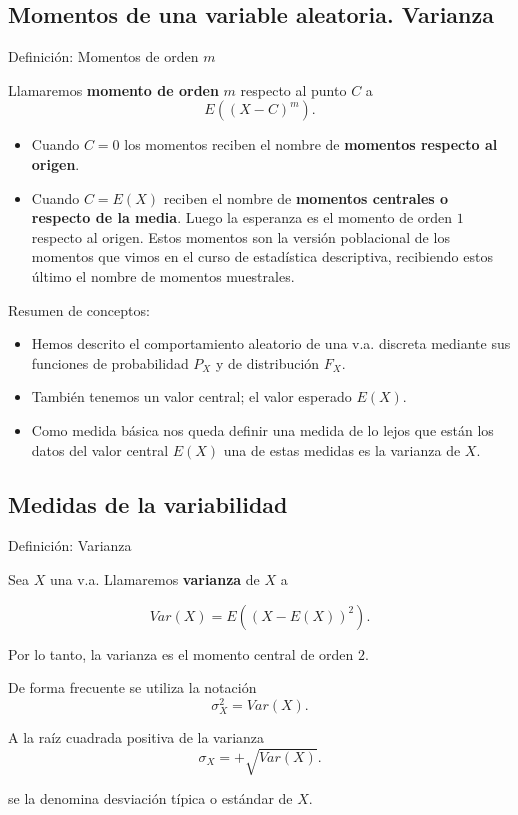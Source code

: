 \documentclass[
  letterpaper,
  DIV=11,
  numbers=noendperiod]{scrreprt}
\providecommand{\tightlist}{%
  \setlength{\itemsep}{0pt}\setlength{\parskip}{0pt}}\usepackage{longtable,booktabs,array}
\begin{document}
\subsection{Momentos de una variable aleatoria.
Varianza}\label{momentos-de-una-variable-aleatoria.-varianza}

\begin{Proposicion}{Definición: Momentos de orden \(m\)}{}

Llamaremos \textbf{momento de orden} \(m\) respecto al punto \(C\) a
\[E\left((X-C)^m\right).\]

\begin{itemize}
\tightlist
\item
  Cuando \(C=0\) los momentos reciben el nombre de \textbf{momentos
  respecto al origen}.
\item
  Cuando \(C=E(X)\) reciben el nombre de \textbf{momentos centrales o
  respecto de la media}. Luego la esperanza es el momento de orden \(1\)
  respecto al origen. Estos momentos son la versión poblacional de los
  momentos que vimos en el curso de estadística descriptiva, recibiendo
  estos último el nombre de momentos muestrales.
\end{itemize}

\end{Proposicion}

Resumen de conceptos:

\begin{itemize}
\tightlist
\item
  Hemos descrito el comportamiento aleatorio de una v.a. discreta
  mediante sus funciones de probabilidad \(P_{X}\) y de distribución
  \(F_{X}\).
\item
  También tenemos un valor central; el valor esperado \(E(X)\).
\item
  Como medida básica nos queda definir una medida de lo lejos que están
  los datos del valor central \(E(X)\) una de estas medidas es la
  varianza de \(X\).
\end{itemize}

\subsection{Medidas de la
variabilidad}\label{medidas-de-la-variabilidad}

\begin{Definicion}{Definición: Varianza}{}

Sea \(X\) una v.a. Llamaremos \textbf{varianza} de \(X\) a

\[Var(X)=E((X-E(X))^2).\]

Por lo tanto, la varianza es el momento central de orden \(2\).

De forma frecuente se utiliza la notación \[\sigma_{X}^2=Var(X).\]

A la raíz cuadrada positiva de la varianza
\[\sigma_{X}=+\sqrt{Var(X)}.\]

se la denomina desviación típica o estándar de \(X\).

\end{Definicion}
\end{document}
